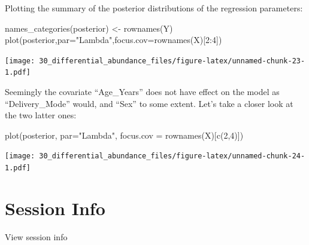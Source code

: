 \documentclass[
]{book}
\newenvironment{Shaded}{\begin{snugshade}}{\end{snugshade}}
\newcommand{\AttributeTok}[1]{\textcolor[rgb]{0.77,0.63,0.00}{#1}}
\newcommand{\DecValTok}[1]{\textcolor[rgb]{0.00,0.00,0.81}{#1}}
\newcommand{\FunctionTok}[1]{\textcolor[rgb]{0.00,0.00,0.00}{#1}}
\newcommand{\NormalTok}[1]{#1}
\newcommand{\OtherTok}[1]{\textcolor[rgb]{0.56,0.35,0.01}{#1}}
\newcommand{\SpecialCharTok}[1]{\textcolor[rgb]{0.00,0.00,0.00}{#1}}
\newcommand{\StringTok}[1]{\textcolor[rgb]{0.31,0.60,0.02}{#1}}
\begin{document}
Plotting the summary of the posterior distributions of the regression parameters:

\begin{Shaded}
\begin{Highlighting}[]
\FunctionTok{names\_categories}\NormalTok{(posterior) }\OtherTok{\textless{}{-}} \FunctionTok{rownames}\NormalTok{(Y)}
\FunctionTok{plot}\NormalTok{(posterior,}\AttributeTok{par=}\StringTok{"Lambda"}\NormalTok{,}\AttributeTok{focus.cov=}\FunctionTok{rownames}\NormalTok{(X)[}\DecValTok{2}\SpecialCharTok{:}\DecValTok{4}\NormalTok{])}
\end{Highlighting}
\end{Shaded}

\texttt{[image: 30\_differential\_abundance\_files/figure-latex/unnamed-chunk-23-1.pdf]}

Seemingly the covariate ``Age\_Years'' does not have effect on the model as ``Delivery\_Mode'' would,
and ``Sex'' to some extent. Let's take a closer look at the two latter ones:

\begin{Shaded}
\begin{Highlighting}[]
\FunctionTok{plot}\NormalTok{(posterior, }\AttributeTok{par=}\StringTok{"Lambda"}\NormalTok{, }\AttributeTok{focus.cov =} \FunctionTok{rownames}\NormalTok{(X)[}\FunctionTok{c}\NormalTok{(}\DecValTok{2}\NormalTok{,}\DecValTok{4}\NormalTok{)])}
\end{Highlighting}
\end{Shaded}

\texttt{[image: 30\_differential\_abundance\_files/figure-latex/unnamed-chunk-24-1.pdf]}

\hypertarget{session-info-8}{%
\section*{Session Info}\label{session-info-8}}

View session info
\end{document}
